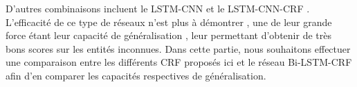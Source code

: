 \documentclass[citation\_needed]{subfiles}
\begin{document}
D'autres combinaisons incluent le LSTM-CNN \citep{chiu2015named} et le LSTM-CNN-CRF \citep{ma2016end}. L'efficacité de ce type de réseaux n'est plus à démontrer \citep{huang2015bidirectional,lample2016neural}, une de leur grande force étant leur capacité de généralisation \citep{augenstein2017generalisation}, leur permettant d'obtenir de très bons scores sur les entités inconnues. Dans cette partie, nous souhaitons effectuer une comparaison entre les différents CRF proposés ici et le réseau Bi-LSTM-CRF afin d'en comparer les capacités respectives de généralisation.
\end{document}
